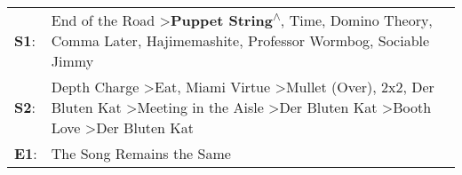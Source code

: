 \begin{supertabular}{p{0.03\textwidth}p{0.92\textwidth}}
 \textbf{S1}:  &                                                                                                                      End of the Road\textsuperscript{} \textgreater \enspace \textbf{Puppet String\textsuperscript{$\wedge$}}, \enspace Time\textsuperscript{}, \enspace Domino Theory\textsuperscript{}, \enspace Comma Later\textsuperscript{}, \enspace Hajimemashite\textsuperscript{}, \enspace Professor Wormbog\textsuperscript{}, \enspace Sociable Jimmy\textsuperscript{}  \enspace  \\
 \textbf{S2}:  &  Depth Charge\textsuperscript{} \textgreater \enspace Eat\textsuperscript{}, \enspace Miami Virtue\textsuperscript{} \textgreater \enspace Mullet (Over)\textsuperscript{}, \enspace 2x2\textsuperscript{}, \enspace Der Bluten Kat\textsuperscript{} \textgreater \enspace Meeting in the Aisle\textsuperscript{} \textgreater \enspace Der Bluten Kat\textsuperscript{} \textgreater \enspace Booth Love\textsuperscript{} \textgreater \enspace Der Bluten Kat\textsuperscript{}  \enspace  \\
 \textbf{E1}:  &                                                                                                                                                                                                                                                                                                                                                                                                                                         The Song Remains the Same\textsuperscript{}  \enspace  \\
\end{supertabular}
